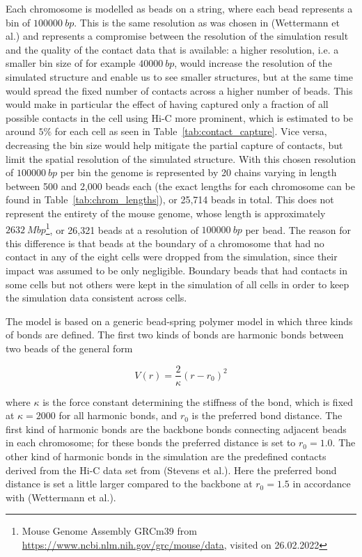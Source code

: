 Each chromosome is modelled as beads on a string, where each bead represents a bin of \(\SI{100000}{bp}\). This is the same resolution as was chosen in (Wettermann et al.\cite{wettermann_minimal_2020}) and represents a compromise between the resolution of the simulation result and the quality of the contact data that is available: a higher resolution, i.e. a smaller bin size of for example \(\SI{40000}{bp}\), would increase the resolution of the simulated structure and enable us to see smaller structures, but at the same time would spread the fixed number of contacts across a higher number of beads. This would make in particular the effect of having captured only a fraction of all possible contacts in the cell using Hi-C more prominent, which is estimated to be around \(5\%\) for each cell as seen in Table~\ref{tab:contact_capture}. Vice versa, decreasing the bin size would help mitigate the partial capture of contacts, but limit the spatial resolution of the simulated structure. With this chosen resolution of \(\SI{100000}{bp}\) per bin the genome is represented by 20 chains varying in length between 500 and 2,000 beads each (the exact lengths for each chromosome can be found in Table~\ref{tab:chrom_lengths}), or 25,714 beads in total. This does not represent the entirety of the mouse genome, whose length is approximately \(\SI{2632}{Mbp}\)\footnote{Mouse Genome Assembly GRCm39 from \url{https://www.ncbi.nlm.nih.gov/grc/mouse/data}, visited on 26.02.2022}, or 26,321 beads at a resolution of \(\SI{100000}{bp}\) per bead. The reason for this difference is that beads at the boundary of a chromosome that had no contact in any of the eight cells were dropped from the simulation, since their impact was assumed to be only negligible. Boundary beads that had contacts in some cells but not others were kept in the simulation of all cells in order to keep the simulation data consistent across cells.

The model is based on a generic bead-spring polymer model in which three kinds of bonds are defined. The first two kinds of bonds are harmonic bonds between two beads of the general form

\[
  V(r) = \frac{2} \kappa \left( r - r_0 \right)^2
\]

where \(\kappa\) is the force constant determining the stiffness of the bond, which is fixed at \(\kappa = 2000\) for all harmonic bonds, and \(r_0\) is the preferred bond distance. The first kind of harmonic bonds are the backbone bonds connecting adjacent beads in each chromosome; for these bonds the preferred distance is set to \(r_0 = 1.0 \). The other kind of harmonic bonds in the simulation are the predefined contacts derived from the Hi-C data set from (Stevens et al.\cite{stevens_3d_2017}). Here the preferred bond distance is set a little larger compared to the backbone at \(r_0 = 1.5\) in accordance with (Wettermann et al.\cite{wettermann_minimal_2020}).


